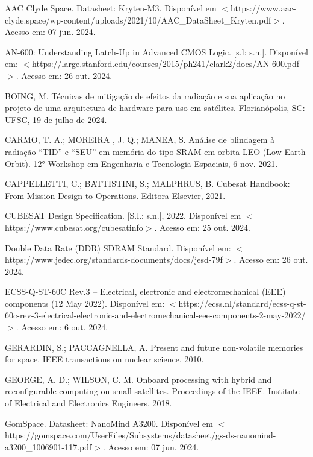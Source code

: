 \begin{flushleft}
\begin{thebibliography}{00} %
 AAC Clyde Space. Datasheet: Kryten-M3. Disponível em $<$https://www.aac-clyde.space/wp-content/uploads/2021/10/AAC\_DataSheet\_Kryten.pdf$>$.  Acesso em: 07 jun. 2024.

 AN-600: Understanding Latch-Up in Advanced CMOS Logic. [s.l: s.n.]. Disponível em: $<$https://large.stanford.edu/courses/2015/ph241/clark2/docs/AN-600.pdf$>$. Acesso em: 26 out. 2024.

 BOING, M. Técnicas de mitigação de efeitos da radiação e sua aplicação no projeto de uma arquitetura de hardware para uso em satélites. Florianópolis, SC: UFSC, 19 de julho de 2024.

 CARMO, T. A.; MOREIRA , J. Q.; MANEA, S. Análise de blindagem à radiação “TID” e “SEU” em memória do tipo SRAM em orbita LEO (Low Earth Orbit). 12° Workshop em Engenharia e Tecnologia Espaciais, 6 nov. 2021.

 CAPPELLETTI, C.; BATTISTINI, S.; MALPHRUS, B. Cubesat Handbook: From Mission Design to Operations. Editora Elsevier, 2021.

 CUBESAT Design Specification. [S.l.: s.n.], 2022. Disponível em $<$https://www.cubesat.org/cubesatinfo$>$. Acesso em: 25 out. 2024.

 Double Data Rate (DDR) SDRAM Standard. Disponível em: $<$https://www.jedec.org/standards-documents/docs/jesd-79f$>$. Acesso em: 26 out. 2024.

 ECSS-Q-ST-60C Rev.3 – Electrical, electronic and electromechanical (EEE) components (12 May 2022). Disponível em: $<$https://ecss.nl/standard/ecss-q-st-60c-rev-3-electrical-electronic-and-electromechanical-eee-components-2-may-2022/$>$. Acesso em: 6 out. 2024.

 GERARDIN, S.; PACCAGNELLA, A. Present and future non-volatile memories for space. IEEE transactions on nuclear science, 2010.

 GEORGE, A. D.; WILSON, C. M. Onboard processing with hybrid and reconfigurable computing on small satellites. Proceedings of the IEEE. Institute of Electrical and Electronics Engineers, 2018.

 GomSpace. Datasheet: NanoMind A3200. Disponível em $<$https://gomspace.com/UserFiles/Subsystems/datasheet/gs-ds-nanomind-a3200\_1006901-117.pdf$>$. Acesso em: 07 jun. 2024.


\end{thebibliography}
\end{flushleft}
